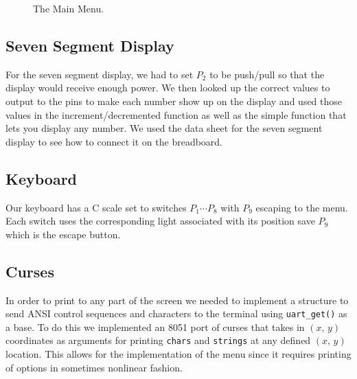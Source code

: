 \documentclass[12pt]{article}
\newcommand{\shellcmd}[1]{\texttt{\colorbox{gray!30}{#1}}}
\begin{document}
\begin{figure}[!ht]
    \centering
    \caption{The Main Menu.}
    \label{menu}
\end{figure}

\subsection{Seven Segment Display}
For the seven segment display, we had to set $P_2$ to be push/pull so that the display would receive enough power. We then looked up the correct values to output to the pins to make each number show up on the display and used those values in the increment/decremented function as well as the simple function that lets you display any number. We used the data sheet for the seven segment display to see how to connect it on the breadboard.

\subsection{Keyboard}
Our keyboard has a C scale set to switches $P_1 \cdots P_8$ with $P_9$ escaping to the menu. Each switch uses the corresponding light associated with its position save $P_9$ which is the escape button.

\subsection{Curses}
In order to print to any part of the screen we needed to implement a structure to send ANSI control sequences and characters to the terminal using \shellcmd{uart\_get()} as a base. To do this we implemented an \num{8051} port of curses that takes in $(x,\, y)$ coordinates as arguments for printing \shellcmd{chars} and \shellcmd{strings} at any defined $(x,\, y)$ location. This allows for the implementation of the menu since it requires printing of options in sometimes nonlinear fashion.
\end{document}
